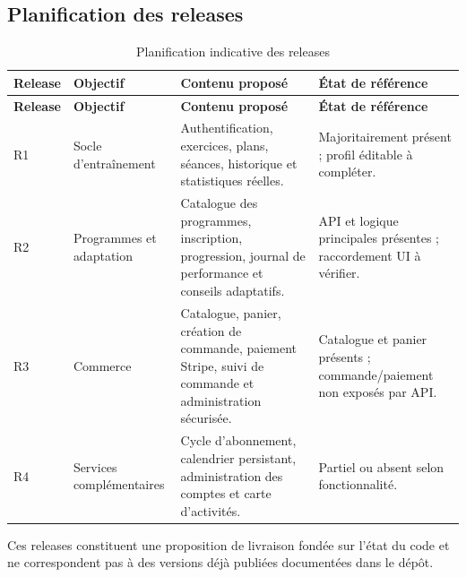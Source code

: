 ﻿\documentclass[12pt,a4paper]{report}
\begin{document}
\subsection{Planification des releases}
\label{c2-s4-sub2}
\begin{singlespace}
\begin{longtable}{|p{1.5cm}|p{3.9cm}|p{7cm}|p{4cm}|}
\caption{Planification indicative des releases}\label{tab:releases}\\
\hline
\textbf{Release} & \textbf{Objectif} & \textbf{Contenu proposé} & \textbf{État de référence} \\\hline
\endfirsthead
\hline
\textbf{Release} & \textbf{Objectif} & \textbf{Contenu proposé} & \textbf{État de référence} \\\hline
\endhead
R1 & Socle d'entraînement & Authentification, exercices, plans, séances, historique et statistiques réelles. & Majoritairement présent ; profil éditable à compléter. \\\hline
R2 & Programmes et adaptation & Catalogue des programmes, inscription, progression, journal de performance et conseils adaptatifs. & API et logique principales présentes ; raccordement UI à vérifier. \\\hline
R3 & Commerce & Catalogue, panier, création de commande, paiement Stripe, suivi de commande et administration sécurisée. & Catalogue et panier présents ; commande/paiement non exposés par API. \\\hline
R4 & Services complémentaires & Cycle d'abonnement, calendrier persistant, administration des comptes et carte d'activités. & Partiel ou absent selon fonctionnalité. \\\hline
\end{longtable}
\end{singlespace}
Ces releases constituent une proposition de livraison fondée sur l'état du code et ne correspondent pas à des versions déjà publiées documentées dans le dépôt.
\end{document}
